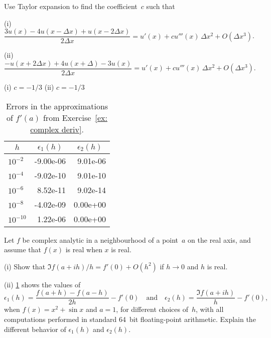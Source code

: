 \begin{Exercises}
\exercise
Use Taylor expansion to find the coefficient~$c$ such that
\begin{description}
\item{(i)} $\dfrac{3u(x)-4u(x-\Delta x)+u(x-2\Delta x)}{2\Delta x}
=u'(x)+cu'''(x)\,\Delta x^2+O(\Delta x^3)$.
\item{(ii)} $\dfrac{-u(x+2\Delta x)+4u(x+\Delta)-3u(x)}{2\Delta x}
=u'(x)+cu'''(x)\,\Delta x^2+O(\Delta x^3)$.
\end{description}
\begin{ans}
(i) $c=-1/3$ \quad(ii) $c=-1/3$
\end{ans}

\begin{table}
\caption{Errors in the approximations of $f'(a)$ from 
Exercise~\ref{ex: complex deriv}.}
\label{tab: complex deriv}
\begin{center}
\renewcommand{\arraystretch}{1.2}
\ttfamily
\begin{tabular}{lrr}
\multicolumn{1}{c}{$h$}&
\multicolumn{1}{c}{$\epsilon_1(h)$}&
\multicolumn{1}{c}{$\epsilon_2(h)$}\\
\hline
$10^{-2}$ &-9.00e-06&9.01e-06\\
$10^{-4}$ &-9.02e-10&9.01e-10\\
$10^{-6}$ & 8.52e-11&9.02e-14\\
$10^{-8}$ &-4.02e-09&0.00e+00\\
$10^{-10}$& 1.22e-06&0.00e+00
\end{tabular}
\end{center}
\end{table}

\exercise\label{ex: complex deriv} 
Let $f$ be complex analytic in a neighbourhood of a point~$a$ on the real axis, 
and assume that $f(x)$ is real when $x$ is real.
\begin{description}
\item{(i)} Show that $\Im f(a+ih)/h=f'(0)+O(h^2)$ if $h\to0$ and $h$ is real.
\item{(ii)} \cref{tab: complex deriv} shows the values of
\[
\epsilon_1(h)=\frac{f(a+h)-f(a-h)}{2h}-f'(0)
\quad\text{and}\quad
\epsilon_2(h)=\frac{\Im f(a+ih)}{h}-f'(0),
\]
when $f(x)=x^2+\sin x$ and $a=1$, for different choices of~$h$, with all 
computations performed in standard 64~bit floating-point arithmetic.  Explain 
the different behavior of $\epsilon_1(h)$ and $\epsilon_2(h)$.
\end{description}


\end{Exercises}
